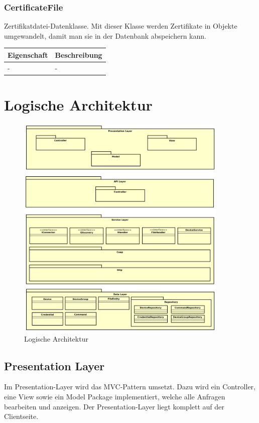 \subsubsection{CertificateFile}
Zertifikatdatei-Datenklasse. Mit dieser Klasse werden Zertifikate in Objekte umgewandelt, damit man sie in der Datenbank abspeichern kann.
\begin{table}[H]
\centering
    \begin{tabular}{@{}l p{14.1cm} @{}}\toprule    
    {Eigenschaft} & {Beschreibung}\\ \midrule      
    - & -\\
    \bottomrule
    \end{tabular}
\end{table}


\section{Logische Architektur}
\begin{figure} [H]
	\begin{center}
	\includegraphics[width=0.90\textwidth]{../03_Design/images/architektur.png}
	\caption{Logische Architektur}
	\end{center}
\end{figure}


\subsection{Presentation Layer}
Im Presentation-Layer wird das MVC-Pattern umsetzt. Dazu wird ein Controller, eine View sowie ein Model Package implementiert, welche alle Anfragen bearbeiten und anzeigen. Der Presentation-Layer liegt komplett auf der Clientseite.
